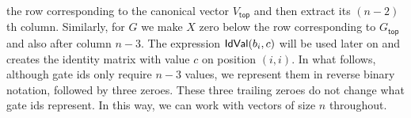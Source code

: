 the row corresponding to the canonical vector $V_{\mathsf{top}}$ and then extract its
$(n-2)$th column. Similarly, for $G$ we make $X$ zero below the row corresponding to
$G_{\mathsf{top}}$ and also after column $n-3$. The expression $\mathsf{IdVal}(b_i, c)$ will be used later on and creates the identity matrix with value $c$ on position $(i,i)$. In what follows, although gate ids only require $n-3$ values, we represent them in reverse binary notation, followed by three zeroes.
These three trailing zeroes do not change what gate ids represent. In this way, we can work with vectors of size $n$ throughout.

%
%
